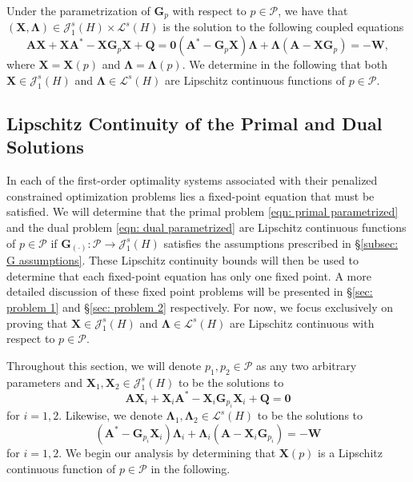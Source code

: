 \documentclass{amsart}
\newcommand{\sL}{\mathscr L}
\newcommand{\sJ}{\mathscr J}
\newcommand{\p}[1]{\left( {#1} \right)}
\newcommand{\sP}{\mathcal{P}}
\newcommand{\bA}{\mathbf A}
\newcommand{\bX}{\mathbf X}
\newcommand{\bQ}{\mathbf Q}
\newcommand{\bG}{\mathbf G}
\newcommand{\bLambda}{\boldsymbol{\Lambda}}
\newcommand{\bW}{\mathbf W}
\begin{document}
Under the parametrization of $\bG_p$ with respect to $p\in\sP$, we have that $\p{\bX,\bLambda} \in\sJ_1^s(H)\times\sL^s(H)$ is the solution to the following coupled equations
\begin{subequations}
    \begin{equation} \label{eqn: primal parametrized}
        \bA\bX+\bX\bA^* - \bX\bG_p\bX+\bQ = \mathbf 0
    \end{equation}
    \begin{equation} \label{eqn: dual parametrized}
        \p{\bA^*-\bG_p\bX}\bLambda + \bLambda\p{\bA-\bX\bG_p} = -\bW,
    \end{equation}
\end{subequations}
where $\bX=\bX(p)$ and $\bLambda = \bLambda(p)$. We determine in the following that both $\bX \in \sJ_1^s(H)$ and $\bLambda \in \sL^s(H)$ are Lipschitz continuous functions of $p \in \sP$.

\subsection{Lipschitz Continuity of the Primal and Dual Solutions}
In each of the first-order optimality systems associated with their penalized constrained optimization problems lies a fixed-point equation that must be satisfied. We will determine that the primal problem \eqref{eqn: primal parametrized} and the dual problem \eqref{eqn: dual parametrized} are Lipschitz continuous functions of $p\in \sP$ if $\bG_{\p{\cdot}} : \sP \rightarrow \sJ_1^s(H)$ satisfies the assumptions prescribed in \S\ref{subsec: G assumptions}. These Lipschitz continuity bounds will then be used to determine that each fixed-point equation has only one fixed point. A more detailed discussion of these fixed point problems will be presented in \S\ref{sec: problem 1} and \S\ref{sec: problem 2} respectively. For now, we focus exclusively on proving that $\bX\in\sJ_1^s(H)$ and $\bLambda \in \sL^s(H)$ are Lipschitz continuous with respect to $p \in \sP$. 

Throughout this section, we will denote $p_1,p_2\in\sP$ as any two arbitrary parameters and $\bX_1, \bX_2 \in \sJ_1^s(H)$ to be the solutions to
\begin{equation} \label{eqn: primal indexed}
    \bA\bX_i + \bX_i\bA^* - \bX_i\bG_{p_i}\bX_i + \bQ = \mathbf 0
\end{equation}
for $i=1,2$. Likewise, we denote $\bLambda_1, \bLambda_2 \in \sL^s(H)$ to be the solutions to 
\begin{equation} \label{eqn: dual indexed}
    \p{\bA^* - \bG_{p_i}\bX_i}\bLambda_i
    + 
    \bLambda_i\p{\bA-\bX_i\bG_{p_i}} = -\bW
\end{equation}
for $i=1,2$. We begin our analysis by determining that $\bX(p)$ is a Lipschitz continuous function of $p \in \sP$ in the following. 
\end{document}
